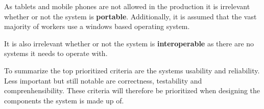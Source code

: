 As tablets and mobile phones are not allowed in the production it is irrelevant whether or not the system is \textbf{portable}.
Additionally, it is assumed that the vast majority of workers use a windows based operating system.

It is also irrelevant whether or not the system is \textbf{interoperable} as there are no systems it needs to operate with.

To summarize the top prioritized criteria are the systems usability and reliability.
Less important but still notable are correctness, testability and comprenhensibility.
These criteria will therefore be prioritized when designing the components the system is made up of.
